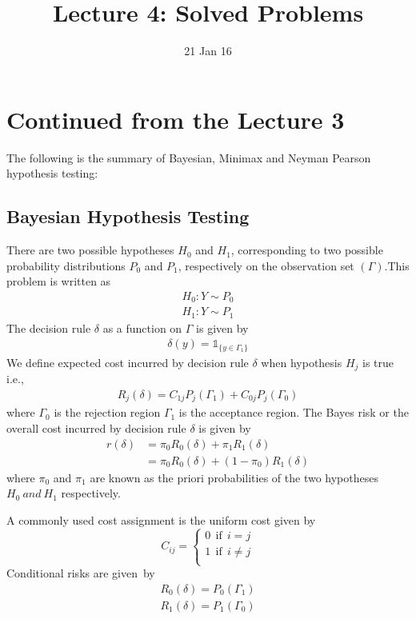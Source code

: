 \documentclass[a4paper,english,12pt]{article}
\title{Lecture 4: Solved Problems}
\date{21 Jan 16}
\begin{document}
\maketitle
  
\section{Continued from the Lecture 3}
The following is the summary of Bayesian, Minimax and Neyman Pearson hypothesis testing:
\subsection{Bayesian Hypothesis Testing}
There are two possible hypotheses $H_{0}$ and $H_{1}$, corresponding to two possible probability distributions $P_{0}$ and $P_{1}$, respectively on the observation set $(\Gamma)$.This problem is written as
\begin{eqnarray}
H_{0}:Y\sim P_{0}\\\nonumber
H_{1}:Y\sim P_{1}
\end{eqnarray}
The decision rule $\delta$ as a function on $\Gamma$ is given by
\begin{eqnarray}
\delta(y)=\mathds{1}_{\{y\in\Gamma_{1}\}}
\end{eqnarray}
We define expected cost incurred by decision rule $\delta$ when hypothesis $H_{j}$ is true i.e.,
\begin{eqnarray}
R_{j}(\delta)= C_{1j}P_{j}(\Gamma_{1})+C_{0j}P_{j}(\Gamma_{0})
\end{eqnarray}
where $\Gamma_0$ is the rejection region $\Gamma_1$ is the  acceptance region.
The Bayes risk or the overall cost incurred by decision rule $\delta$ is given by
\begin{align}
r(\delta)&= \pi_{0}R_{0}(\delta)+\pi_{1}R_{1}(\delta)\nonumber\\
         &= \pi_{0}R_{0}(\delta)+(1-\pi_{0})R_{1}(\delta)
\end{align} 
where $\pi_{0}$ and $\pi_{1}$ are known as the priori probabilities of the two hypotheses $H_0~and~H_1$ respectively.
\par A commonly used cost assignment is the uniform cost given by
\begin{equation}
C_{ij}= 
		\begin{cases}
		0~~\mbox{if}~~i=j\\
		1~~\mbox{if}~~i\neq j\\
		\end{cases}
\end{equation}
Conditional risks are given~by
\begin{eqnarray}		
  R_{0}(\delta)=P_{0}(\Gamma_{1})\nonumber\\
  R_{1}(\delta)=P_{1}(\Gamma_{0})\nonumber     
\end{eqnarray}
\end{document}
